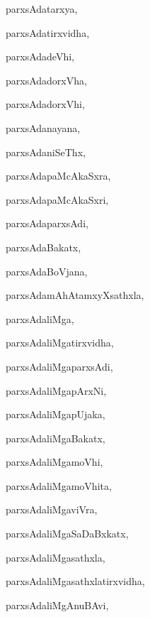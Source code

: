 \begin{multicols}{3}
{\noindent
{parxsAdatarxya}, \pageref{parxsAdatarxya}

\noindent
{parxsAdatirxvidha}, \pageref{parxsAdatirxvidha}

\noindent
{parxsAdadeVhi}, \pageref{parxsAdadeVhi}

\noindent
{parxsAdadorxVha}, \pageref{parxsAdadorxVha}

\noindent
{parxsAdadorxVhi}, \pageref{parxsAdadorxVhi}

\noindent
{parxsAdanayana}, \pageref{parxsAdanayana}

\noindent
{parxsAdaniSeThx}, \pageref{parxsAdaniSeThx}

\noindent
{parxsAdapaMcAkaSxra}, \pageref{parxsAdapaMcAkaSxra}

\noindent
{parxsAdapaMcAkaSxri}, \pageref{parxsAdapaMcAkaSxri}

\noindent
{parxsAdaparxsAdi}, \pageref{parxsAdaparxsAdi}

\noindent
{parxsAdaBakatx}, \pageref{parxsAdaBakatx}

\noindent
{parxsAdaBoVjana}, \pageref{parxsAdaBoVjana}

\noindent
{parxsAdamAhAtamxyXsathxla}, \pageref{parxsAdamAhAtamxyXsathxla}

\noindent
{parxsAdaliMga}, \pageref{parxsAdaliMga}

\noindent
{parxsAdaliMgatirxvidha}, \pageref{parxsAdaliMgatirxvidha}

\noindent
{parxsAdaliMgaparxsAdi}, \pageref{parxsAdaliMgaparxsAdi}

\noindent
{parxsAdaliMgapArxNi}, \pageref{parxsAdaliMgapArxNi}

\noindent
{parxsAdaliMgapUjaka}, \pageref{parxsAdaliMgapUjaka}

\noindent
{parxsAdaliMgaBakatx}, \pageref{parxsAdaliMgaBakatx}

\noindent
{parxsAdaliMgamoVhi}, \pageref{parxsAdaliMgamoVhi}

\noindent
{parxsAdaliMgamoVhita}, \pageref{parxsAdaliMgamoVhita}

\noindent
{parxsAdaliMgaviVra}, \pageref{parxsAdaliMgaviVra}

\noindent
{parxsAdaliMgaSaDaBxkatx}, \pageref{parxsAdaliMgaSaDaBxkatx}

\noindent
{parxsAdaliMgasathxla}, \pageref{parxsAdaliMgasathxla}

\noindent
{parxsAdaliMgasathxlatirxvidha}, \pageref{parxsAdaliMgasathxlatirxvidha}

\noindent
{parxsAdaliMgAnuBAvi}, \pageref{parxsAdaliMgAnuBAvi}

}
\end{multicols}
